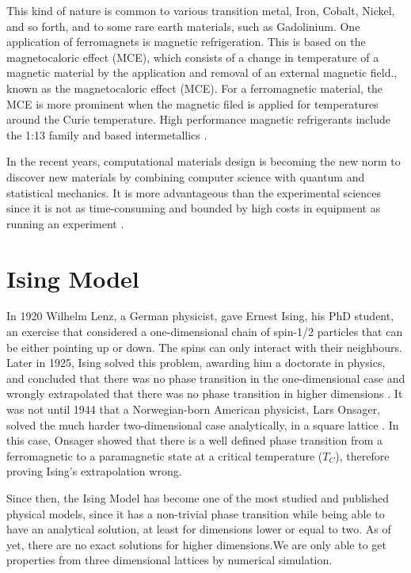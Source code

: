 This kind of nature is common to various transition metal, Iron, Cobalt, Nickel, and so forth, and to some rare earth materials, such as Gadolinium.
One application of ferromagnets is magnetic refrigeration. This is based on the magnetocaloric effect (MCE), which consists of a change in temperature of a magnetic material by the application and removal of an external magnetic field., known as the magnetocaloric effect (MCE). For a ferromagnetic material, the MCE is more prominent when the magnetic filed is applied for temperatures around the Curie temperature. 
High performance magnetic refrigerants include the  1:13 family \cite{Fujita} and  based intermetallics \cite{Bruck}. 

In the recent years, computational materials design is becoming the new norm to discover new materials by combining computer science with quantum and statistical mechanics. It is more advantageous than the experimental sciences since it is not as time-consuming and bounded by high costs in equipment as running an experiment \cite{Curtarolo2013,Chen2019, Sanvito2017}. 

\section{Ising Model}

In 1920 Wilhelm Lenz, a German physicist, gave Ernest Ising, his PhD student, an exercise that considered a one-dimensional chain of spin-1/2 particles that can be either pointing up or down. The spins can only interact with their neighbours. Later in 1925, Ising solved this problem, awarding him a doctorate in physics,  and concluded that there was no phase transition in the one-dimensional case and wrongly extrapolated that there was no phase transition in higher dimensions \cite{Ising1925}. It was not until 1944 that a Norwegian-born American physicist, Lars Onsager, solved the much harder two-dimensional case analytically, in a square lattice \cite{Onsager1944}. In this case, Onsager showed that there is a well defined phase transition from a ferromagnetic to a paramagnetic state at a critical temperature ($T_C$), therefore proving Ising's extrapolation wrong.

Since then, the Ising Model has become one of the most studied and published physical models, since it has a non-trivial phase transition while being able to have an analytical solution, at least for dimensions lower or equal to two. As of yet, there are no exact solutions for higher dimensions.We are only able to get properties from three dimensional lattices by numerical simulation.

